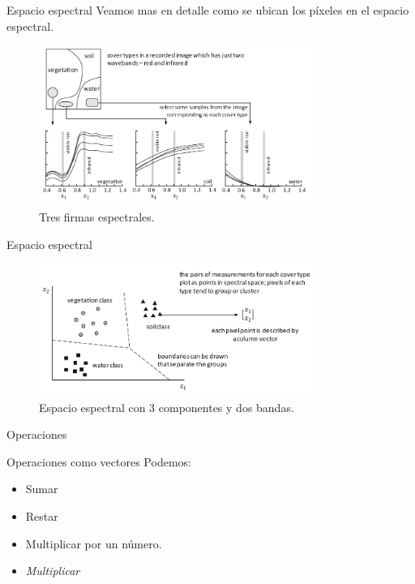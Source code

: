 \documentclass[handout]{beamer}
\begin{document}
\begin{frame}{Espacio espectral}
  Veamos mas en detalle como se ubican los píxeles en el espacio espectral. \pause
  \begin{figure}
    \includegraphics[width=0.8\textwidth]{imagenes/firmas-3.png}
    \caption{Tres firmas espectrales. }
  \end{figure}
\end{frame}

\begin{frame}{Espacio espectral}
  \begin{figure}
    \includegraphics[width=0.8\textwidth]{imagenes/espacio-3.png}
    \caption{Espacio espectral con 3 componentes y dos bandas. }
  \end{figure}
\end{frame}
\begin{frame}{Operaciones}
  \begin{block}{Operaciones como vectores}
    Podemos:
    \begin{itemize}[<+->]
      \item Sumar
      \item Restar
      \item Multiplicar por un número.
      \item \emph{Multiplicar}
    \end{itemize}
  \end{block}
\end{frame}
\end{document}
